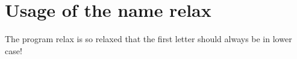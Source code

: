 
\section{Usage of the name relax}

The program relax is so relaxed that the first letter should always be in lower case!
